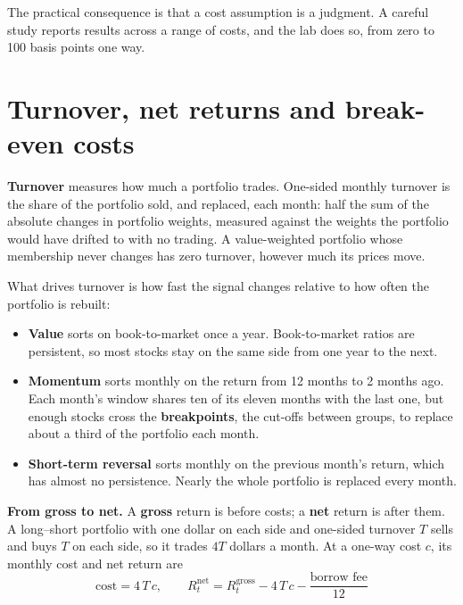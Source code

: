 The practical consequence is that a cost assumption is a judgment. A careful study reports results across a range of costs, and the lab does so, from zero to 100 basis points one way.

\section{Turnover, net returns and break-even costs}
\label{sec:06-turnover}

\textbf{Turnover} measures how much a portfolio trades. One-sided monthly turnover is the share of the portfolio sold, and replaced, each month: half the sum of the absolute changes in portfolio weights, measured against the weights the portfolio would have drifted to with no trading. A value-weighted portfolio whose membership never changes has zero turnover, however much its prices move.

What drives turnover is how fast the signal changes relative to how often the portfolio is rebuilt:

\begin{itemize}
  \item \textbf{Value} sorts on book-to-market once a year. Book-to-market ratios are persistent, so most stocks stay on the same side from one year to the next.
  \item \textbf{Momentum} sorts monthly on the return from 12 months to 2 months ago. Each month's window shares ten of its eleven months with the last one, but enough stocks cross the \textbf{breakpoints}, the cut-offs between groups, to replace about a third of the portfolio each month.
  \item \textbf{Short-term reversal} sorts monthly on the previous month's return, which has almost no persistence. Nearly the whole portfolio is replaced every month.
\end{itemize}

\textbf{From gross to net.} A \textbf{gross} return is before costs; a \textbf{net} return is after them. A long--short portfolio with one dollar on each side and one-sided turnover $T$ sells and buys $T$ on each side, so it trades $4T$ dollars a month. At a one-way cost $c$, its monthly cost and net return are
\begin{equation}
  \text{cost} = 4\,T\,c, \qquad R^{\text{net}}_t = R^{\text{gross}}_t - 4\,T\,c - \frac{\text{borrow fee}}{12}
  \label{eq:06-net}
\end{equation}

